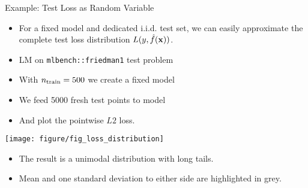 \documentclass[11pt,compress,t,notes=noshow, xcolor=table]{beamer}
\begin{document}
\begin{vbframe}{Example: Test Loss as Random Variable}
\begin{itemize}
  \small
  \item For a fixed model and dedicated i.i.d. test set, we can easily approximate
      the complete test loss distribution $L(y, \hat{f}(\mathbf{x}))$.
  \item LM on \texttt{mlbench::friedman1} test problem
  \item With $n_{\mathrm{train}} = 500$ we create a fixed model
  \item We feed 5000 fresh test points to model
  \item And plot the pointwise $L2$ loss.
\end{itemize}

\vfill

\begin{minipage}[c]{0.5\textwidth}
  \texttt{[image: figure/fig\_loss\_distribution]}
\end{minipage}
\begin{minipage}[c]{0.45\textwidth}
  \begin{itemize}
    \small
    \item The result is a unimodal 
    distribution with long tails.
    \item Mean and one standard deviation to either side are highlighted in 
    grey.
  \end{itemize}
\end{minipage}
\end{vbframe}
\end{document}
